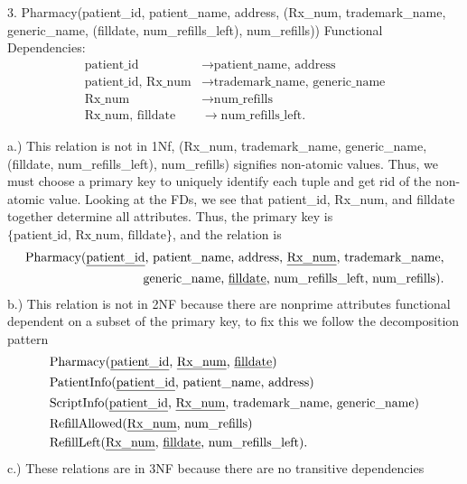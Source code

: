 \documentclass{report}
\begin{document}
   \pagebreak 
   \begin{mdframed}
       3. Pharmacy(patient\_id, patient\_name, address, (Rx\_num, trademark\_name,  \\
       generic\_name, (filldate, num\_refills\_left), num\_refills)) 
       \bigbreak \noindent 
       Functional Dependencies:
       \begin{align*}
           \text{patient\_id} &\to \text{patient\_name, address} \\
           \text{patient\_id, Rx\_num} &\to \text{trademark\_name, generic\_name} \\
           \text{Rx\_num} &\to \text{num\_refills} \\
           \text{Rx\_num, filldate} &\to \text{num\_refills\_left}
       .\end{align*}
   \end{mdframed}
   \bigbreak \noindent 
   a.) This relation is not in 1Nf,  (Rx\_num, trademark\_name, generic\_name, (filldate, num\_refills\_left), num\_refills) signifies non-atomic values. Thus, we must choose a primary key to uniquely identify each tuple and get rid of the non-atomic value. Looking at the FDs, we see that patient\_id, Rx\_num, and filldate together determine all attributes. Thus, the primary key is $\{\text{patient\_id, Rx\_num, filldate}\}$, and the relation is
   \begin{align*}
              \text{Pharmacy(\underline{patient\_id}, patient\_name, address, \underline{Rx\_num}, trademark\_name,}  \\ 
              \text{generic\_name, \underline{filldate}, num\_refills\_left, num\_refills)}
   .\end{align*}
   \bigbreak \noindent 
   b.) This relation is not in 2NF because there are nonprime attributes functional dependent on a subset of the primary key, to fix this we follow the decomposition pattern
   \begin{align*}
       &\text{Pharmacy(\underline{patient\_id}, \underline{Rx\_num}, \underline{filldate})} \\
       &\text{PatientInfo(\underline{patient\_id}, patient\_name, address)} \\
       &\text{ScriptInfo(\underline{patient\_id}, \underline{Rx\_num}, trademark\_name, generic\_name)} \\
       &\text{RefillAllowed(\underline{Rx\_num}, num\_refills)} \\
       &\text{RefillLeft(\underline{Rx\_num}, \underline{filldate}, num\_refills\_left)}
   .\end{align*}
   \bigbreak \noindent 
   c.) These relations are in 3NF because there are no transitive dependencies
\end{document}
